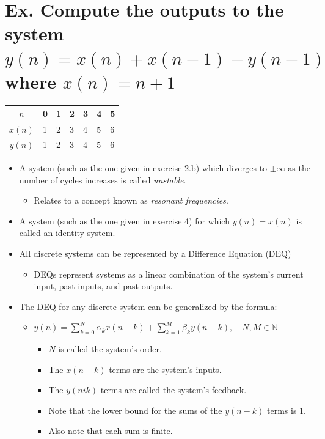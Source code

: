 \documentclass{article}
\begin{document}
\section[Example ~\thesection]{Ex. Compute the outputs to the system $y(n) = x(n) + x(n-1) - y(n-1)$ where $x(n) = n + 1$}

\begin{tabularx}{\linewidth}{| c || Y Y Y Y Y Y |}
	\hline
	$n$ & 0 & 1 & 2 & 3 & 4 & 5 \\
	\hline
	$x(n)$ & 1 & 2 & 3 & 4 & 5 & 6 \\
	$y(n)$ & 1 & 2 & 3 & 4 & 5 & 6 \\
	\hline
\end{tabularx}

\vspace{.5cm}

\begin{itemize}
	\item A system (such as the one given in exercise 2.b) which diverges to $\pm \infty$ as the number of cycles increases is called \emph{unstable}.
	\begin{itemize}
		\item Relates to a concept known as \emph{resonant frequencies}.
	\end{itemize}
	\item A system (such as the one given in exercise 4) for which $y(n) = x(n)$ is called an identity system.
	\item All discrete systems can be represented by a Difference Equation (DEQ)
	\begin{itemize}
		\item DEQs represent systems as a linear combination of the system's current input, past inputs, and past outputs.
	\end{itemize}
	\item The DEQ for any discrete system can be generalized by the formula:
	\begin{itemize}
		\item $y(n) = \sum_{k=0}^{N}\alpha_{k}x(n-k) + \sum_{k=1}^{M}\beta_{k}y(n-k), \quad N, M \in \mathbb{N}$
		\begin{itemize}
			\item $N$ is called the system's order.
			\item The $x(n-k)$ terms are the system's inputs.
			\item The $y(nik)$ terms are called the system's feedback.
			\item Note that the lower bound for the sums of the $y(n-k)$ terms is 1.
			\item Also note that each sum is finite.
		\end{itemize}
	\end{itemize}
\end{itemize}
\end{document}
